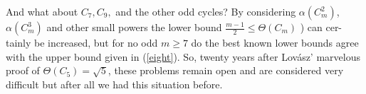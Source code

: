 
And what about $C_7, C_9,$ and the other odd cycles? By considering $\alpha(C_m^2)$,
$\alpha(C_m^3)$ and other small powers the lower bound ${\frac{m-1}{2}} \leq \Theta(C_m)$ ) can cer-
tainly be increased, but for no odd $m \geq 7$  do the best known lower bounds
agree with the upper bound given in (\ref{eight}). So, twenty years after Lov\'asz' 
marvelous proof of $\Theta(C_5) = \sqrt{5}$, these problems remain open and are 
considered very difficult \text{---} but after all we had this situation before.\\

